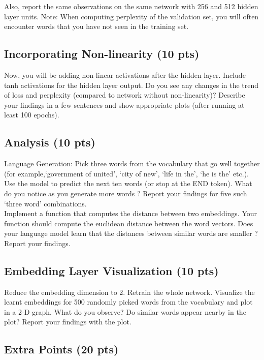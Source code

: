 \documentclass[10pt]{article}
\begin{document}
Also, report the same observations on the same network with 256 and 512 hidden layer units.
Note: When computing perplexity of the validation set, you will often encounter words that you have not seen in the training set.

\subsection{Incorporating Non-linearity (10 pts)}

Now, you will be adding non-linear activations after the hidden layer. Include tanh activations for the hidden layer output. Do you see any changes in the trend of loss and perplexity (compared to network without non-linearity)? Describe your findings in a few sentences and show appropriate plots (after running at least 100 epochs).

\subsection{Analysis (10 pts)}

Language Generation: Pick three words from the vocabulary that go well together (for example,‘government of united’, ‘city of new’, ‘life in the’, ‘he is the’ etc.). Use the model to predict the next ten words (or stop at the END token). What do you notice as you generate more words ? Report your findings for five such `three word' combinations. 
\\

Implement a function that computes the distance between two embeddings. Your function should compute the euclidean distance between the word vectors. Does your language model learn that the distances between similar words are smaller ? Report your findings.

\subsection{Embedding Layer Visualization (10 pts)}

Reduce the embedding dimension to 2. Retrain the whole network. Visualize the learnt embeddings for 500 randomly picked words from the vocabulary and plot in a 2-D graph. What do you observe? Do similar words appear nearby in the plot? Report your findings with the plot.


\subsection{Extra Points (20 pts)}
\end{document}
